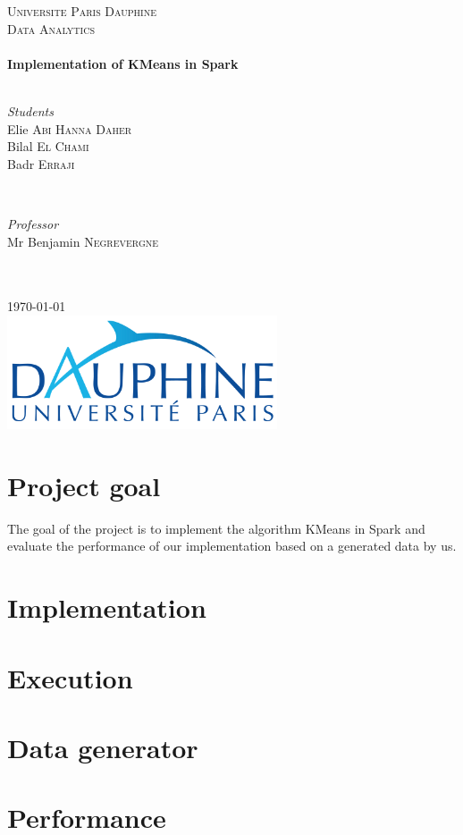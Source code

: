 \documentclass[english]{article}
\begin{document}
\begin{titlepage}
\SetDate[29/04/2018]
\newcommand{\HRule}{\rule{\linewidth}{0.5mm}}
\center 
\textsc{\LARGE Universite Paris Dauphine}\\[1.5cm] 
\textsc{\Large Data Analytics}\\[0.5cm]
\HRule \\[0.4cm] { \huge \bfseries
Implementation of KMeans in Spark}\\[0.4cm] \HRule \\[1.5cm]
\begin{minipage}{0.4\textwidth}
	\begin{flushleft} \large
		\emph{Students}
		\\ Elie \textsc{Abi Hanna Daher}
		\\ Bilal \textsc{El Chami}
		\\ Badr \textsc{Erraji}
	\end{flushleft}
\end{minipage}
~
\begin{minipage}{0.4\textwidth}
	\begin{flushright} \large
		\emph{Professor} 
		\\ Mr Benjamin \textsc{Negrevergne}
		\\  \hspace{1cm}
		\\  \hspace{1cm}
	\end{flushright}
\end{minipage}\\[2cm]
{\large \today}\\[2cm]
\includegraphics[width=8cm]{img/dauphine.png}
\vfill
\end{titlepage}
 
\tableofcontents 
\newpage

\section{Project goal}
The goal of the project is to implement the algorithm KMeans in Spark and evaluate the performance of our implementation based on a generated data by us.

\section{Implementation}

\section{Execution}

\section{Data generator}

\section{Performance}
\end{document}
